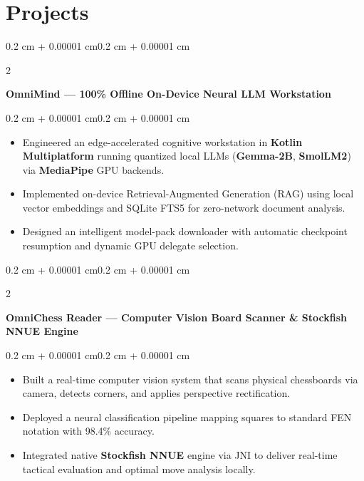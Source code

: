 \documentclass[10pt, a4paper]{article}
\newenvironment{highlights}{
    \begin{itemize}[
        topsep=0.06 cm,
        parsep=0.05 cm,
        partopsep=0pt,
        itemsep=0pt,
        leftmargin=0.4 cm + 10pt
    ]
}{
    \end{itemize}
}
\newenvironment{onecolentry}{
    \begin{adjustwidth}{0.2 cm + 0.00001 cm}{0.2 cm + 0.00001 cm}
}{
    \end{adjustwidth}
}
\newenvironment{twocolentry}[2][]{
    \onecolentry
    \def\secondColumn{#2}
    \setcolumnwidth{\fill, 4.5 cm}
    \begin{paracol}{2}
}{
    \switchcolumn \raggedleft \secondColumn
    \end{paracol}
    \endonecolentry
}
\let\hrefWithoutArrow\href
\renewcommand{\href}[2]{\hrefWithoutArrow{#1}{\ifthenelse{\equal{#2}{}}{ }{#2 }\raisebox{.15ex}{\footnotesize \faExternalLink*}}}
\begin{document}
\section{Projects}
\begin{twocolentry}{\textit{\href{https://github.com/I-am-Manu-Singh/OmniMind}{\underline{Repo}}}}
    \textbf{OmniMind — 100\% Offline On-Device Neural LLM Workstation}
\end{twocolentry}
\vspace{0.06 cm}
\begin{onecolentry}
    \begin{highlights}
    \item Engineered an edge-accelerated cognitive workstation in \textbf{Kotlin Multiplatform} running quantized local LLMs (\textbf{Gemma-2B}, \textbf{SmolLM2}) via \textbf{MediaPipe} GPU backends.
    \item Implemented on-device Retrieval-Augmented Generation (RAG) using local vector embeddings and SQLite FTS5 for zero-network document analysis.
    \item Designed an intelligent model-pack downloader with automatic checkpoint resumption and dynamic GPU delegate selection.
    \end{highlights}
\end{onecolentry}
\vspace{0.14 cm}

\begin{twocolentry}{\textit{\href{https://github.com/I-am-Manu-Singh/OmniChessReader}{\underline{Repo}}}}
    \textbf{OmniChess Reader — Computer Vision Board Scanner \& Stockfish NNUE Engine}
\end{twocolentry}
\vspace{0.06 cm}
\begin{onecolentry}
    \begin{highlights}
    \item Built a real-time computer vision system that scans physical chessboards via camera, detects corners, and applies perspective rectification.
    \item Deployed a neural classification pipeline mapping squares to standard FEN notation with 98.4\% accuracy.
    \item Integrated native \textbf{Stockfish NNUE} engine via JNI to deliver real-time tactical evaluation and optimal move analysis locally.
    \end{highlights}
\end{onecolentry}
\vspace{0.14 cm}
\end{document}

